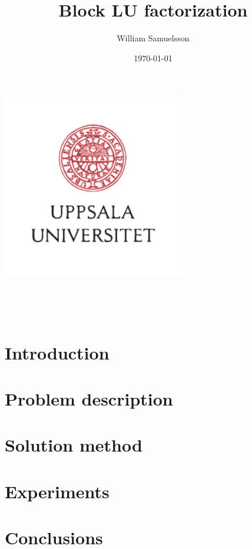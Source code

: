 \documentclass{article}
\title{Block LU factorization}
\author{William Samuelsson}
\date{\today}
\begin{document}
\begin{titlepage}
    \centering
    \vfill
    \includegraphics[width=8cm]{UU_logo.pdf} %
    \vfill
        {\bfseries\Large
        \makeatletter
        \@title\
        \vskip2cm
        \@date\
        \vskip2cm
        
        \@author\
        \makeatother
    }    
    \vfill
    \vfill
\end{titlepage}

\section{Introduction}

\section{Problem description}

\section{Solution method}

\section{Experiments}

\section{Conclusions}


\end{document}
